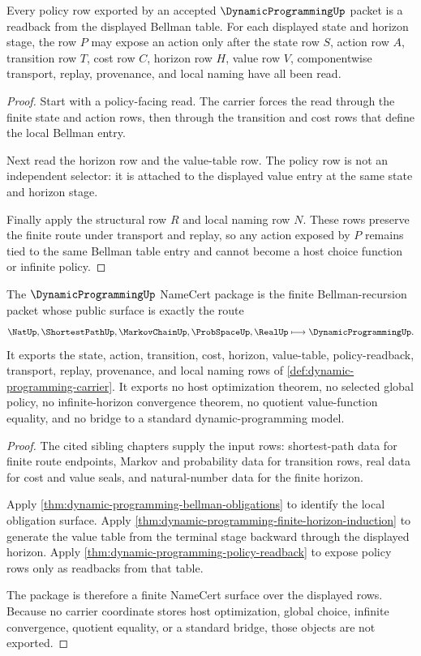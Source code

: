\begin{theorem}
\label{thm:dynamic-programming-policy-readback}
Every policy row exported by an accepted $\DynamicProgrammingUp$ packet is a readback from the displayed Bellman table. For each displayed state and horizon stage, the row $P$ may expose an action only after the state row $S$, action row $A$, transition row $T$, cost row $C$, horizon row $H$, value row $V$, componentwise transport, replay, provenance, and local naming have all been read.
\end{theorem}
\begin{proof}
Start with a policy-facing read. The carrier forces the read through the finite state and action rows, then through the transition and cost rows that define the local Bellman entry.

Next read the horizon row and the value-table row. The policy row is not an independent selector: it is attached to the displayed value entry at the same state and horizon stage.

Finally apply the structural row $R$ and local naming row $N$. These rows preserve the finite route under transport and replay, so any action exposed by $P$ remains tied to the same Bellman table entry and cannot become a host choice function or infinite policy.
\end{proof}

\begin{theorem}
\label{thm:dynamic-programming-namecert-package}
The $\DynamicProgrammingUp$ NameCert package is the finite Bellman-recursion packet whose public surface is exactly the route
$$
\NatUp,\ShortestPathUp,\MarkovChainUp,\ProbSpaceUp,\RealUp \longmapsto \DynamicProgrammingUp .
$$
It exports the state, action, transition, cost, horizon, value-table, policy-readback, transport, replay, provenance, and local naming rows of \autoref{def:dynamic-programming-carrier}. It exports no host optimization theorem, no selected global policy, no infinite-horizon convergence theorem, no quotient value-function equality, and no bridge to a standard dynamic-programming model.
\end{theorem}
\begin{proof}
The cited sibling chapters supply the input rows: shortest-path data for finite route endpoints, Markov and probability data for transition rows, real data for cost and value seals, and natural-number data for the finite horizon.

Apply \autoref{thm:dynamic-programming-bellman-obligations} to identify the local obligation surface. Apply \autoref{thm:dynamic-programming-finite-horizon-induction} to generate the value table from the terminal stage backward through the displayed horizon. Apply \autoref{thm:dynamic-programming-policy-readback} to expose policy rows only as readbacks from that table.

The package is therefore a finite NameCert surface over the displayed rows. Because no carrier coordinate stores host optimization, global choice, infinite convergence, quotient equality, or a standard bridge, those objects are not exported.
\end{proof}

